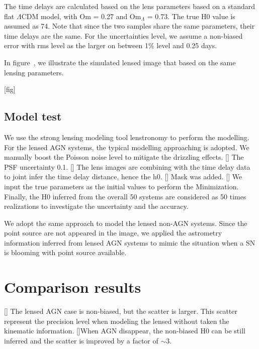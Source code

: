\documentclass[useAMS,usenatbib,usegraphicx]{mn2e}
\begin{document}
The time delays are calculated based on the lens parameters based on a standard flat $\Lambda$CDM model, with Om = 0.27 and Om$_\Lambda$ = 0.73. The true H0 value is assumed as 74. Note that since the two samples share the same parameters, their time delays are the same. For the uncertainties level, we assume a non-biased error with rms level as the larger on between 1\% level and 0.25 days.

In figure~, we illustrate the simulated lensed image that based on the same lensing parameters.

[fig]

\subsection{Model test}
We use the strong lensing modeling tool lenstronomy to perform the modelling. For the lensed AGN systems, the typical modelling approaching is adopted. We manually boost the Poisson noise level to mitigate the drizzling effects. 
[] The PSF uncertainty 0.1. 
[] The lens images are combining with the time delay data to joint infer the time delay distance, hence the h0.
[] Mask was added.
[] We input the true parameters as the initial values to perform the Minimization. Finally, the H0 inferred from the overall 50 systems are considered as 50 times realizations to investigate the uncertainty and the accuracy.

We adopt the same approach to model the lensed non-AGN systems. Since the point source are not appeared in the image, we applied the astrometry information inferred from lensed AGN systems to mimic the situation when a SN is blooming with point source available.  


\section{Comparison results}
[] The lensed AGN case is non-biased, but the scatter is larger. This scatter represent the precision level when modeling the lensed without taken the kinematic information. 
[]When AGN disappear, the non-biased H0 can be still inferred and the scatter is improved by a factor of $\sim$3. 
\end{document}
